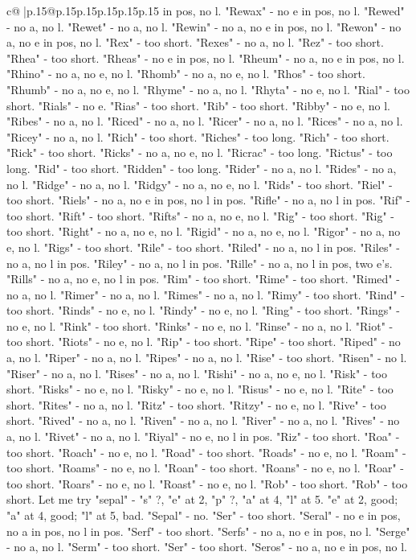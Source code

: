\documentclass{article}
\begin{document}
{\begin{supertabular}{c@{$\;$}|p{.15\linewidth}@{}p{.15\linewidth}p{.15\linewidth}p{.15\linewidth}p{.15\linewidth}p{.15\linewidth}}
{{{in pos, no l. "Rewax" {-} no e in pos, no l. "Rewed" {-} no a, no l. "Rewet" {-} no a, no l. "Rewin" {-} no a, no e in pos, no l. "Rewon" {-} no a, no e in pos, no l. "Rex" {-} too short. "Rexes" {-} no a, no l. "Rez" {-} too short. "Rhea" {-} too short. "Rheas" {-} no e in pos, no l. "Rheum" {-} no a, no e in pos, no l. "Rhino" {-} no a, no e, no l. "Rhomb" {-} no a, no e, no l. "Rhos" {-} too short. "Rhumb" {-} no a, no e, no l. "Rhyme" {-} no a, no l. "Rhyta" {-} no e, no l. "Rial" {-} too short. "Rials" {-} no e. "Rias" {-} too short. "Rib" {-} too short. "Ribby" {-} no e, no l. "Ribes" {-} no a, no l. "Riced" {-} no a, no l. "Ricer" {-} no a, no l. "Rices" {-} no a, no l. "Ricey" {-} no a, no l. "Rich" {-} too short. "Riches" {-} too long. "Rich" {-} too short. "Rick" {-} too short. "Ricks" {-} no a, no e, no l. "Ricrac" {-} too long. "Rictus" {-} too long. "Rid" {-} too short. "Ridden" {-} too long. "Rider" {-} no a, no l. "Rides" {-} no a, no l. "Ridge" {-} no a, no l. "Ridgy" {-} no a, no e, no l. "Rids" {-} too short. "Riel" {-} too short. "Riels" {-} no a, no e in pos, no l in pos. "Rifle" {-} no a, no l in pos. "Rif" {-} too short. "Rift" {-} too short. "Rifts" {-} no a, no e, no l. "Rig" {-} too short. "Rig" {-} too short. "Right" {-} no a, no e, no l. "Rigid" {-} no a, no e, no l. "Rigor" {-} no a, no e, no l. "Rigs" {-} too short. "Rile" {-} too short. "Riled" {-} no a, no l in pos. "Riles" {-} no a, no l in pos. "Riley" {-} no a, no l in pos. "Rille" {-} no a, no l in pos, two e's. "Rills" {-} no a, no e, no l in pos. "Rim" {-} too short. "Rime" {-} too short. "Rimed" {-} no a, no l. "Rimer" {-} no a, no l. "Rimes" {-} no a, no l. "Rimy" {-} too short. "Rind" {-} too short. "Rinds" {-} no e, no l. "Rindy" {-} no e, no l. "Ring" {-} too short. "Rings" {-} no e, no l. "Rink" {-} too short. "Rinks" {-} no e, no l. "Rinse" {-} no a, no l. "Riot" {-} too short. "Riots" {-} no e, no l. "Rip" {-} too short. "Ripe" {-} too short. "Riped" {-} no a, no l. "Riper" {-} no a, no l. "Ripes" {-} no a, no l. "Rise" {-} too short. "Risen" {-} no l. "Riser" {-} no a, no l. "Rises" {-} no a, no l. "Rishi" {-} no a, no e, no l. "Risk" {-} too short. "Risks" {-} no e, no l. "Risky" {-} no e, no l. "Risus" {-} no e, no l. "Rite" {-} too short. "Rites" {-} no a, no l. "Ritz" {-} too short. "Ritzy" {-} no e, no l. "Rive" {-} too short. "Rived" {-} no a, no l. "Riven" {-} no a, no l. "River" {-} no a, no l. "Rives" {-} no a, no l. "Rivet" {-} no a, no l. "Riyal" {-} no e, no l in pos. "Riz" {-} too short. "Roa" {-} too short. "Roach" {-} no e, no l. "Road" {-} too short. "Roads" {-} no e, no l. "Roam" {-} too short. "Roams" {-} no e, no l. "Roan" {-} too short. "Roans" {-} no e, no l. "Roar" {-} too short. "Roars" {-} no e, no l. "Roast" {-} no e, no l. "Rob" {-} too short. "Rob" {-} too short. Let me try "sepal" {-} "s" ?, "e" at 2, "p" ?, "a" at 4, "l" at 5. "e" at 2, good; "a" at 4, good; "l" at 5, bad. "Sepal" {-} no. "Ser" {-} too short. "Seral" {-} no e in pos, no a in pos, no l in pos. "Serf" {-} too short. "Serfs" {-} no a, no e in pos, no l. "Serge" {-} no a, no l. "Serm" {-} too short. "Ser" {-} too short. "Seros" {-} no a, no e in pos, no l. }}}
\end{supertabular}}
\end{document}
